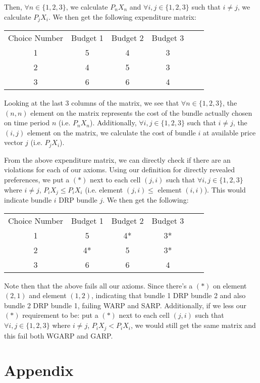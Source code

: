 \documentclass{article} %
\begin{document}
Then, $\forall n\in\{1,2,3\}$, we calculate $P_{n}X_{n}$ and $\forall i,j\in\{1,2,3\}$ such that $i\not=j$, we calculate $P_{j}X_{i}$. We then get the following expenditure matrix:

\begin{center}
\begin{tabular}{ cccccc } 
Choice Number & Budget 1 & Budget 2 & Budget 3 \\
1&5&4&3 \\
2&4&5&3 \\
3&6&6&4
\end{tabular}
\end{center}

Looking at the last 3 columns of the matrix, we see that $\forall n\in\{1,2,3\}$, the $(n,n)$ element on the matrix represents the cost of the bundle actually chosen on time period $n$ (i.e. $P_{n}X_{n}$). Additionally, $\forall i,j\in\{1,2,3\}$ such that $i\not=j$, the $(i,j)$ element on the matrix, we calculate the cost of bundle $i$ at available price vector $j$ (i.e. $P_{j}X_{i}$).
\bigskip

From the above expenditure matrix, we can directly check if there are an violations for each of our axioms. Using our definition for directly revealed preferences, we put a $(*)$ next to each cell $(j,i)$ such that $\forall i,j\in\{1,2,3\}$ where $i\not=j$, $P_iX_j\leq P_iX_i$ (i.e. element $(j,i)\leq$ element $(i,i)$). This would indicate bundle $i$ DRP bundle $j$. We then get the following:

\begin{center}
\begin{tabular}{ cccccc } 
Choice Number & Budget 1 & Budget 2 & Budget 3 \\
1&5&4*&3* \\
2&4*&5&3* \\
3&6&6&4
\end{tabular}
\end{center}

Note then that the above fails all our axioms. Since there's a $(*)$ on element $(2,1)$ and element $(1,2)$, indicating that bundle 1 DRP bundle 2 and also bundle 2 DRP bundle 1, failing WARP and SARP. Additionally, if we less our $(*)$ requirement to be: put a $(*)$ next to each cell $(j,i)$ such that $\forall i,j\in\{1,2,3\}$ where $i\not=j$, $P_iX_j<P_iX_i$, we would still get the same matrix and this fail both WGARP and GARP.

\section{Appendix}
\end{document}
